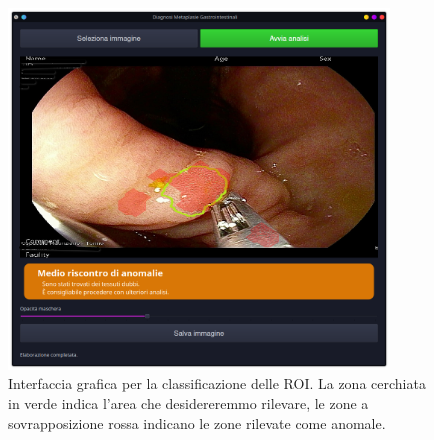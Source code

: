 \begin{figure}[h]
    \center
    \includegraphics[width=0.9\textwidth]{./assets/gui-one.png}
    \caption{\label{fig:gui-one}Interfaccia grafica per la classificazione delle ROI. La zona cerchiata in verde indica l'area che desidereremmo rilevare, le zone a sovrapposizione rossa indicano le zone rilevate come anomale.}
\end{figure}

